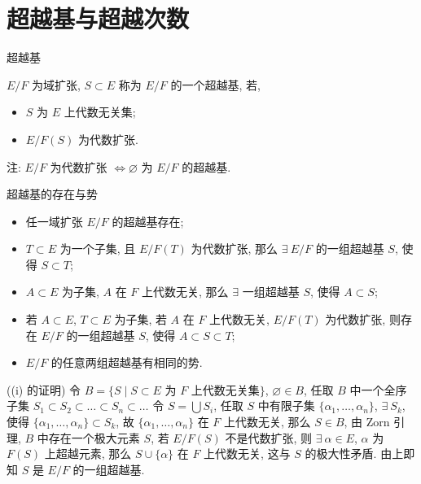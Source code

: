 
\section[超越基]{超越基与超越次数}


\begin{frame}{超越基}

\begin{Def}[超越基]
$E/F$ 为域扩张, $S \subset E$ 称为 $E/F$ 的一个超越基, 若,
\begin{itemize}
\item {} $S$ 为 $E$ 上代数无关集;
\item {} $E/F(S)$ 为代数扩张.
\end{itemize}
\end{Def}

注: $E/F$ 为代数扩张 $\iff \varnothing$ 为 $E/F$ 的超越基.

\end{frame}


\begin{frame}{超越基的存在与势}

\begin{lem}[超越基的存在与势]
\begin{itemize}
\item[(i)] 任一域扩张 $E/F$ 的超越基存在;
\item[(ii)] $T \subset E$ 为一个子集, 且 $E/F(T)$ 为代数扩张,
  那么 $\exists\ E/F$ 的一组超越基 $S$, 使得 $S \subset T$;
\item[(iii)] $A \subset E$ 为子集, $A$ 在 $F$ 上代数无关, 那么
  $\exists$ 一组超越基 $S$, 使得 $A \subset S$;
\item[(iv)] 若 $A \subset E$, $T \subset E$ 为子集, 若 $A$ 在 $F$ 上代数无关,
  $E/F(T)$ 为代数扩张, 则存在 $E/F$ 的一组超越基 $S$, 使得 $A \subset S \subset T$;
\item[(v)] $E/F$ 的任意两组超越基有相同的势.
\end{itemize}
\end{lem}

\startproof[bg=yellow, fg=red]((i) 的证明)
令 $B = \{ S \mid S \subset E \text{ 为 } F \text{ 上代数无关集} \}$,
$\varnothing \in B$,
任取 $B$ 中一个全序子集 $S_1 \subset S_2 \subset \dots \subset S_n \subset \dots$
令 $S = \bigcup S_i$, 任取 $S$ 中有限子集 $\{ \alpha_1, \dots, \alpha_n \}$,
$\exists\ S_k$, 使得 $\{ \alpha_1, \dots, \alpha_n \} \subset S_k$,
故 $\{ \alpha_1, \dots, \alpha_n \}$ 在 $F$ 上代数无关,
那么 $S \in B$, 由 Zorn 引理, $B$ 中存在一个极大元素 $S$,
若 $E/F(S)$ 不是代数扩张, 则 $\exists\ \alpha \in E$,
$\alpha$ 为 $F(S)$ 上超越元素,
那么 $S \cup \{ \alpha \}$ 在 $F$ 上代数无关, 这与 $S$ 的极大性矛盾.
由上即知 $S$ 是 $E/F$ 的一组超越基.

\end{frame}

